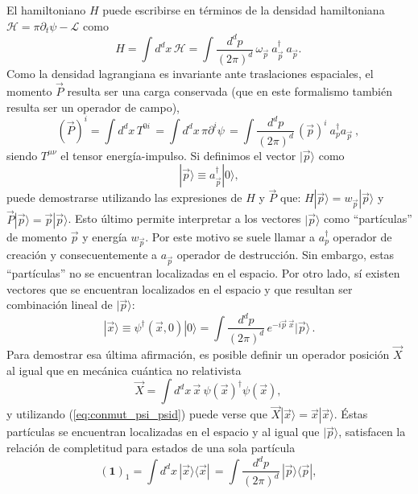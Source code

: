 El hamiltoniano $H$ puede escribirse en términos de la densidad hamiltoniana $\mathcal{H}=\pi\partial_t\psi-\mathcal{L}$ como
\begin{equation}
H=\int d^dx \, \mathcal{H} = \int \frac{d^dp}{(2\pi)^d}\, \omega_{\vec{p}}\:a_{\vec{p}}^{
\dag}\: a_{\vec{p}}.\,
\end{equation}
Como la densidad lagrangiana es invariante ante traslaciones espaciales, el momento $\vec{P}$ resulta ser una carga conservada (que en este formalismo también resulta ser un operador de campo),
\begin{equation}
(\vec{P})^i=\int d^dx \,T^{0i} \,=\int d^dx \,\pi\partial^i \psi \,=\int \frac{d^dp}{(2\pi)^d} \,(\vec{p})^i\:a_{p}^{\dag}a_{\vec{p}}\:, \,
\end{equation}
siendo $T^{\mu \nu}$ el tensor energía-impulso. Si definimos el vector $|\vec{p}\rangle$ como
\begin{equation}
|\vec{p}\rangle \equiv a_{\vec{p}}^{\dag}|0\rangle,
\end{equation}
puede demostrarse utilizando las expresiones de $H$ y $\vec{P}$ que: $H|\vec{p}\rangle = w_{\vec{p}} |\vec{p}\rangle $ y $\vec{P}|\vec{p}\rangle = \vec{p} |\vec{p}\rangle $. Esto último permite interpretar a los vectores $|\vec{p}\rangle $ como “partículas” de momento $\vec{p}$ y energía $w_{\vec{p}}$. Por este motivo se suele llamar a $a_{p}^{\dag}$ operador de creación y consecuentemente a $a_{\vec{p}}$ operador de destrucción. Sin embargo, estas “partículas” no se encuentran localizadas en el espacio. Por otro lado, sí existen vectores que se encuentran localizados en el espacio y que resultan ser combinación lineal de $|\vec{p}\rangle$:
\begin{equation}
|\vec{x}\rangle \equiv \psi^{\dag}(\vec{x},0)|0\rangle=\int \frac{d^dp}{(2\pi)^d} \,e^{-i\vec{p}\:\vec{x}}|\vec{p}\rangle \,.
\label{eq:local_nr}
\end{equation} 
Para demostrar esa última afirmación, es posible definir un operador posición $\vec{X}$ al igual que en mecánica cuántica no relativista
\begin{equation}
\vec{X}=\int d^dx \,\vec{x}\:\psi(\vec{x})^{\dag}\psi(\vec{x}) , \,
\end{equation} 
y utilizando (\ref{eq:conmut_psi_psid}) puede verse que $\vec{X}|\vec{x}\rangle=\vec{x}|\vec{x}\rangle$. Éstas partículas se encuentran localizadas en el espacio y al igual que $|\vec{p}\rangle$, satisfacen la relación de completitud para estados de una sola partícula
\begin{equation}
(\textbf{1})_1=\int d^dx\,|\vec{x}\rangle \langle\vec{x}| \,=\int \frac{d^dp}{(2\pi)^d}\, |\vec{p}\rangle \langle \vec{p}|,\,
\end{equation}
